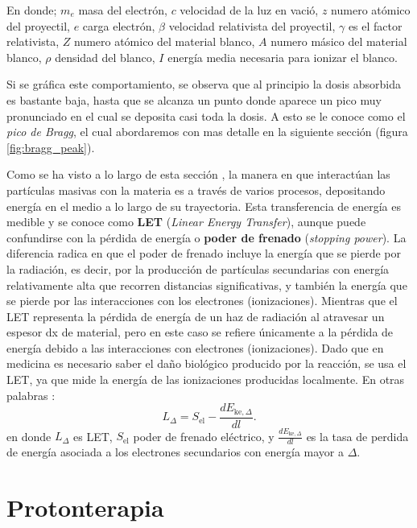\documentclass[onecolumn,12pt]{article} %
\begin{document}
En donde; $m_e$ masa del electrón, $c$ velocidad de la luz en vació, $z$ numero atómico del proyectil, $e$ carga electrón,  $\beta$ velocidad relativista del proyectil, $\gamma$ es el factor relativista, $Z$ numero atómico del material blanco, $A$ numero  másico del material blanco, $\rho$ densidad del blanco, $I$ energía media necesaria para ionizar el blanco.  

Si se gráfica este comportamiento, se observa que al principio la dosis absorbida es bastante baja, hasta que se alcanza un punto donde aparece un pico muy pronunciado en el cual se deposita casi toda la dosis. A esto se le conoce como el \textit{pico de Bragg}, el cual abordaremos con mas detalle en la siguiente sección (figura \ref{fig:bragg_peak}). 


Como se ha visto a lo largo de esta sección , la manera en que interactúan las partículas masivas con la materia es a través de varios procesos, depositando energía en el medio a lo largo de su trayectoria.  Esta transferencia de energía es medible y se conoce como \textbf{LET} (\textit{Linear Energy Transfer}), aunque puede confundirse con la pérdida de energía o \textbf{poder de frenado} (\textit{stopping power}). La diferencia radica en que el poder de frenado incluye la energía que se pierde por la radiación, es decir, por la producción de partículas secundarias con energía relativamente alta que recorren distancias significativas, y también la energía que se pierde por las interacciones con los electrones (ionizaciones). Mientras que  el LET representa la pérdida de energía de un haz de radiación al atravesar un espesor dx de material, pero en este caso se refiere únicamente a la pérdida de energía debido a las interacciones con electrones (ionizaciones). Dado que en medicina es necesario saber el daño biológico producido por la reacción, se usa el LET, ya que mide la energía de las ionizaciones producidas localmente.  En otras palabras :
\begin{equation}
    L_{\Delta} = S_{\text{el}} - \frac{dE_{\text{ke},\Delta}}{dl}.
\end{equation}
en donde $L_{\Delta}$ es LET, $S_{\text{el}}$ poder de frenado eléctrico, y $\frac{dE_{\text{ke},\Delta}}{dl}$ es la tasa de perdida de energía asociada a los electrones secundarios con energía mayor a  $\Delta$. 








\section{Protonterapia} 
\end{document}
